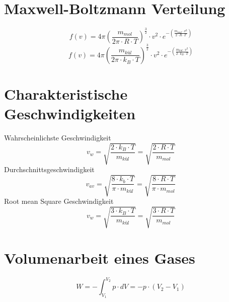 \section{Maxwell-Boltzmann Verteilung}
\[ \boxed{f(v) = 4 \pi \left(\frac{m_{mol}}{2 \pi \cdot R \cdot T}\right)^{\frac{3}{2}}
\cdot v^2 \cdot e^{-\left(\frac{m_{mol} \cdot v^2}{2 \cdot R \cdot T}\right)}} \]
\[ \boxed{f(v) = 4 \pi \left(\frac{m_{kül}}{2 \pi \cdot k_B \cdot T}\right)^{\frac{3}{2}}
\cdot v^2 \cdot e^{-\left(\frac{m_{kül} \cdot v^2}{2 \cdot k_B \cdot T}\right)}} \]

\section{Charakteristische Geschwindigkeiten}
Wahrscheinlichste Geschwindigkeit
\[ \boxed{v_w = \sqrt{\frac{2 \cdot k_B \cdot T}{m_{kül}}} 
= \sqrt{\frac{2 \cdot R \cdot T}{m_{mol}}}} \]
Durchschnittsgeschwindigkeit
\[ \boxed{v_{av} = \sqrt{\frac{8 \cdot k_b \cdot T}{\pi \cdot m_{kül}}} 
= \sqrt{\frac{8 \cdot R \cdot T}{\pi \cdot m_{mol}}}} \]
Root mean Square Geschwindigkeit
\[ \boxed{v_w = \sqrt{\frac{3 \cdot k_B \cdot T}{m_{kül}}} 
= \sqrt{\frac{3 \cdot R \cdot T}{m_{mol}}}} \]

\section{Volumenarbeit eines Gases}
\[ \boxed{W = -\int_{V_1}^{V_2} p \cdot dV = - p \cdot (V_2 - V_1)} \]
